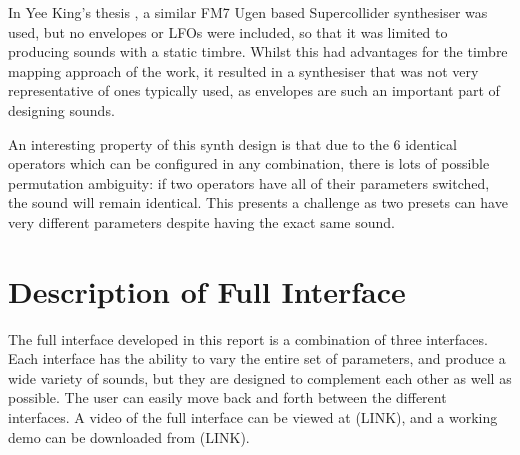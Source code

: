 \documentclass[11pt, oneside]{report}   	%
\begin{document}
In Yee King's thesis \cite{YeeKing}, a similar FM7 Ugen based Supercollider synthesiser was used, but no envelopes or LFOs were included, so that it was limited to producing sounds with a static timbre. Whilst this had advantages for the timbre mapping approach of the work, it resulted in a synthesiser that was not very representative of ones typically used, as envelopes are such an important part of designing sounds. 

An interesting property of this synth design is that due to the 6 identical operators which can be configured in any combination, there is lots of possible permutation ambiguity: if two operators have all of their parameters switched, the sound will remain identical. This presents a challenge as two presets can have very different parameters despite having the exact same sound. 

\chapter{Description of Full Interface}
The full interface developed in this report is a combination of three interfaces. Each interface has the ability to vary the entire set of parameters, and produce a wide variety of sounds, but they are designed to complement each other as well as possible. The user can easily move back and forth between the different interfaces. A video of the full interface can be viewed at (LINK), and a working demo can be downloaded from (LINK).
\end{document}
